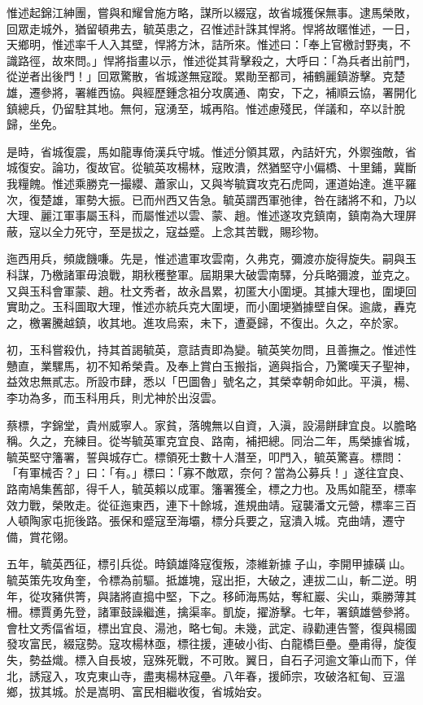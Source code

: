 \begin{pinyinscope}
惟述起錦江紳團，嘗與和耀曾施方略，謀所以綴寇，故省城獲保無事。逮馬榮敗，回眾走城外，猶留頓弗去，毓英患之，召惟述計誅其悍將。悍將故暱惟述，一日，天鄉明，惟述率千人入其壁，悍將方沐，詰所來。惟述曰：「奉上官檄討野夷，不識路徑，故來問。」悍將指畫以示，惟述從其背擊殺之，大呼曰：「為兵者出前門，從逆者出後門！」回眾驚散，省城遂無寇蹤。累勛至都司，補鶴麗鎮游擊。克楚雄，遷參將，署維西協。與經歷鍾念祖分攻廣通、南安，下之，補順云協，署開化鎮總兵，仍留駐其地。無何，寇湧至，城再陷。惟述慮殘民，佯議和，卒以計脫歸，坐免。

是時，省城復震，馬如龍專倚漢兵守城。惟述分領其眾，內詰奸宄，外禦強敵，省城復安。論功，復故官。從毓英攻楊林，寇敗潰，然猶堅守小偏橋、十里鋪，冀斷我糧餽。惟述乘勝克一撮纓、蕭家山，又與岑毓寶攻克石虎岡，運道始達。進平羅次，復楚雄，軍勢大振。已而州西又告急。毓英謂西軍弛律，咎在諸將不和，乃以大理、麗江軍事屬玉科，而屬惟述以雲、蒙、趙。惟述遂攻克鎮南，鎮南為大理屏蔽，寇以全力死守，至是拔之，寇益蹙。上念其苦戰，賜珍物。

迤西用兵，頻歲饑嗛。先是，惟述遣軍攻雲南，久弗克，彌渡亦旋得旋失。嗣與玉科謀，乃檄諸軍毋浪戰，期秋穫整軍。屆期果大破雲南驛，分兵略彌渡，並克之。又與玉科會軍蒙、趙。杜文秀者，故永昌累，初匿大小圍埂。其據大理也，圍埂回實助之。玉科圖取大理，惟述亦統兵克大圍埂，而小圍埂猶據壁自保。逾歲，轟克之，檄署騰越鎮，收其地。進攻烏索，未下，遭憂歸，不復出。久之，卒於家。

初，玉科嘗殺仇，持其首謁毓英，意詰責即為變。毓英笑勿問，且善撫之。惟述性戇直，業騾馬，初不知希榮貴。及奉上賞白玉搬指，適與指合，乃驚嘆天子聖神，益效忠無貳志。所設市肆，悉以「巴圖魯」號名之，其榮幸朝命如此。平滇，楊、李功為多，而玉科用兵，則尤神於出沒雲。

蔡標，字錦堂，貴州威寧人。家貧，落魄無以自資，入滇，設湯餅肆宜良。以膽略稱。久之，充練目。從岑毓英軍克宜良、路南，補把總。同治二年，馬榮據省城，毓英堅守籓署，誓與城存亡。標領死士數十人潛至，叩門入，毓英驚喜。標問：「有軍械否？」曰：「有。」標曰：「寡不敵眾，奈何？當為公募兵！」遂往宜良、路南鳩集舊部，得千人，毓英賴以成軍。籓署獲全，標之力也。及馬如龍至，標率效力戰，榮敗走。從征迤東西，連下十餘城，進規曲靖。寇襲潘文元營，標率三百人頓陶家屯扼後路。張保和蹙寇至海壩，標分兵要之，寇潰入城。克曲靖，遷守備，賞花翎。

五年，毓英西征，標引兵從。時鎮雄降寇復叛，漆維新據子山，李開甲據磺山。毓英策先攻角奎，令標為前驅。抵雄塊，寇出拒，大破之，連拔二山，斬二逆。明年，從攻豬供箐，與諸將直搗中堅，下之。移師海馬姑，奪紅巖、尖山，乘勝薄其柵。標賈勇先登，諸軍鼓譟繼進，擒渠率。凱旋，擢游擊。七年，署鎮雄營參將。會杜文秀偪省垣，標出宜良、湯池，略七甸。未幾，武定、祿勸連告警，復與楊國發攻富民，綴寇勢。寇攻楊林亟，標往援，連破小街、白龍橋巨壘。壘甫得，旋復失，勢益熾。標入自長坡，寇殊死戰，不可敗。翼日，自石子河逾文筆山而下，佯北，誘寇入，攻克東山寺，盡夷楊林寇壘。八年春，援師宗，攻破洛紅甸、豆溫鄉，拔其城。於是嵩明、富民相繼收復，省城始安。


\end{pinyinscope}
